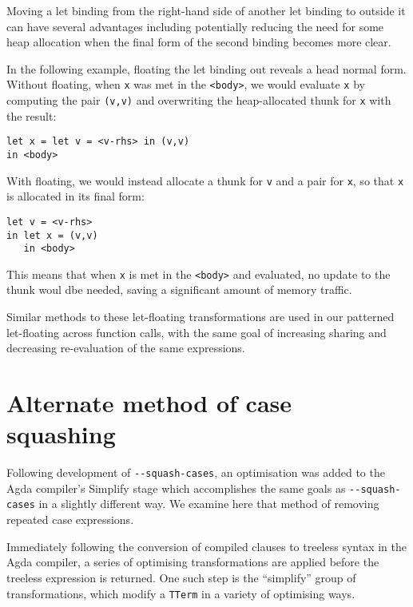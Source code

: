 \begin{enumerate}
Moving a let binding from the right-hand side of another let binding to outside it can have several advantages including potentially reducing the need for some heap allocation when the final form of the second binding becomes more clear.\citep{jones1996}

In the following example, floating the let binding out reveals a head normal form. Without floating, when \lstinline{x} was met in the \lstinline{<body>}, we would evaluate \lstinline{x} by computing the pair \lstinline{(v,v)} and overwriting the heap-allocated thunk for \lstinline{x} with the result:

\begin{lstlisting}
let x = let v = <v-rhs> in (v,v)
in <body>
\end{lstlisting}

With floating, we would instead allocate a thunk for \lstinline{v} and a pair for \lstinline{x}, so that \lstinline{x} is allocated in its final form:

\begin{lstlisting}
let v = <v-rhs>
in let x = (v,v)
   in <body>
\end{lstlisting}

This means that when \lstinline{x} is met in the \lstinline{<body>} and evaluated, no update to the thunk woul dbe needed, saving a significant amount of memory traffic.\citep{jones1996}

\end{enumerate}

Similar methods to these let-floating transformations are used in our patterned let-floating across function calls, with the same goal of increasing sharing and decreasing re-evaluation of the same expressions.

\section{Alternate method of case squashing}
\label{sub:alternate_case_squash}

Following development of \texttt{-{}-squash-cases}, an optimisation was added to the Agda compiler's Simplify stage which accomplishes the same goals as \texttt{-{}-squash-cases} in a slightly different way. We examine here that method of removing repeated case expressions.

Immediately following the conversion of compiled clauses to treeless syntax in the Agda compiler, a series of optimising transformations are applied before the treeless expression is returned. One such step is the ``simplify'' group of transformations, which modify a \lstinline{TTerm} in a variety of optimising ways.

